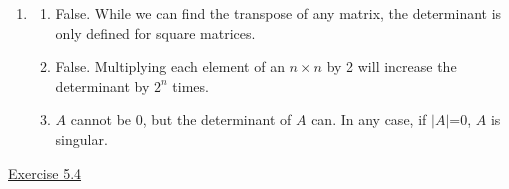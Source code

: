 \begin{enumerate}
\begin{enumerate}
Singular.

\item[(c)]
\[
\begin{aligned} & 7\left|\begin{array}{cc}1 & 4 \\ -3 & -4\end{array}\right|+1\left|\begin{array}{cc}1 & 4 \\ 13 & -4\end{array}\right| \\=& 7(-4+12)+1(-4-52) \\=& 56-56=0 \end{aligned}
\]

Singular.

\item[(d)]
\[ \begin{aligned} &-3\left|\begin{array}{ll}9 & 5 \\ 8 & 6\end{array}\right|-1\left|\begin{array}{cc}-4 & 9 \\ 10 & 8\end{array}\right| \\
 =&-3(54-40)-1(-32-90) \\
 =&-42+122=80 \end{aligned}\]
Non-singular. \vspace{1em}
\end{enumerate}

\item[8.] 
\begin{enumerate}
\item False. While we can find the transpose of any matrix, the determinant is only defined for square matrices. 
\item False. Multiplying each element of an $n \times n$ by 2 will increase the determinant by $2^n$ times. 
\item $A$ cannot be 0, but the determinant of $A$ can. In any case, if $|A|$=0, $A$ is singular.
\end{enumerate}

\end{enumerate}


\underline{Exercise 5.4} 


